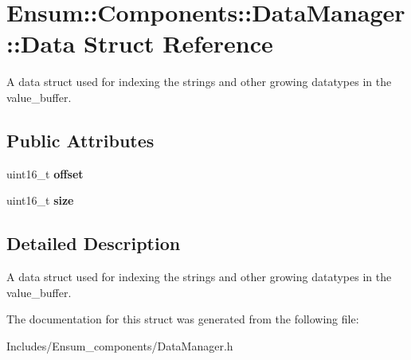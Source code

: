\hypertarget{struct_ensum_1_1_components_1_1_data_manager_1_1_data}{}\section{Ensum\+:\+:Components\+:\+:Data\+Manager\+:\+:Data Struct Reference}
\label{struct_ensum_1_1_components_1_1_data_manager_1_1_data}


A data struct used for indexing the strings and other growing datatypes in the value\+\_\+buffer.  


\subsection*{Public Attributes}
\begin{DoxyCompactItemize}
\item 
uint16\+\_\+t {\bfseries offset}\hypertarget{struct_ensum_1_1_components_1_1_data_manager_1_1_data_a3d8c75f03b155ea6f50119251bc2eed4}{}\label{struct_ensum_1_1_components_1_1_data_manager_1_1_data_a3d8c75f03b155ea6f50119251bc2eed4}

\item 
uint16\+\_\+t {\bfseries size}\hypertarget{struct_ensum_1_1_components_1_1_data_manager_1_1_data_aaa33fb8a50b46948fc1c9c8473a45e29}{}\label{struct_ensum_1_1_components_1_1_data_manager_1_1_data_aaa33fb8a50b46948fc1c9c8473a45e29}

\end{DoxyCompactItemize}


\subsection{Detailed Description}
A data struct used for indexing the strings and other growing datatypes in the value\+\_\+buffer. 

The documentation for this struct was generated from the following file\+:\begin{DoxyCompactItemize}
\item 
Includes/\+Ensum\+\_\+components/Data\+Manager.\+h\end{DoxyCompactItemize}
